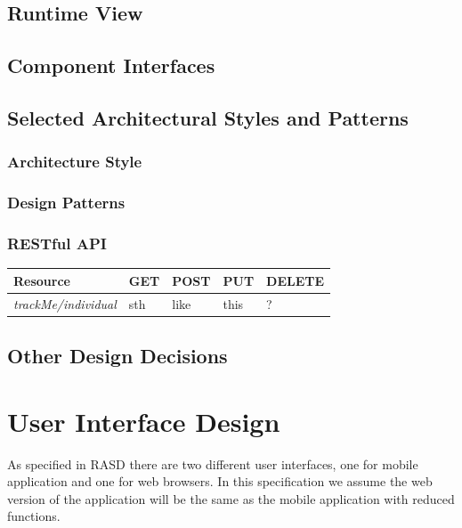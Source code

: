 \documentclass[a4paper]{article}
\begin{document}
\subsection{Runtime View}

\subsection{Component Interfaces}

\subsection{Selected Architectural Styles and Patterns}
    \subsubsection{Architecture Style}
    \subsubsection{Design Patterns}
    \subsubsection{RESTful API}
    \begin{table}[!htpb]
        \begin{tabular}{|p{3cm}|p{1.8cm}|p{1.8cm}|p{1.8cm}|p{1.8cm}|} 
         \hline
         \textbf{Resource} & \textbf{GET} & \textbf{POST} & \textbf{PUT} & \textbf{DELETE} \\
         \hline
         \textit{trackMe/individual} & sth &like & this & ? \\
         \hline
        \end{tabular}
    \end{table}

\subsection{Other Design Decisions}

\newpage
\section{User Interface Design}
As specified in RASD there are two different user interfaces, one for mobile application and one for web browsers. In this specification we assume the web version of the application will be the same as the mobile application with reduced functions.
\end{document}
